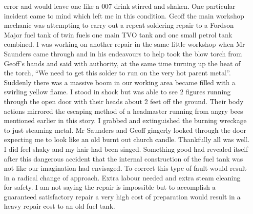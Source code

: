 error and would leave one like a 007 drink stirred and shaken. One particular
incident came to mind which left me in this condition. Geoff the main workshop
mechanic was attempting to carry out a repeat soldering repair to a Fordson
Major fuel tank of twin fuels one main TVO tank and one small petrol tank
combined. I was working on another repair in the same little workshop when Mr
Saunders came through and in his endeavours to help took the blow torch from
Geoff's hands and said with authority, at the same time turning up the heat of
the torch, ``We need to get this solder to run on the very hot parent metal''.
Suddenly there was a massive boom in our working area became filled with a
swirling yellow flame. I stood in shock but was able to see 2 figures running
through the open door with their heads about 2 feet off the ground. Their body
actions mirrored the escaping method of a headmaster running from angry bees
mentioned earlier in this story. I grabbed and extinguished the burning
wreckage to just steaming metal. Mr Saunders and Geoff gingerly looked through
the door expecting me to look like an old burnt out church candle. Thankfully
all was well. I did feel shaky and my hair had been singed. Something good
had revealed itself after this dangerous accident that the internal
construction of the fuel tank was not like our imagination had envisaged. To
correct this type of fault would result in a radical change of approach. Extra
labour needed and extra steam cleaning for safety. I am not saying the repair
is impossible but to accomplish a guaranteed satisfactory repair a very high
cost of preparation would result in a heavy repair cost to an old fuel tank.
